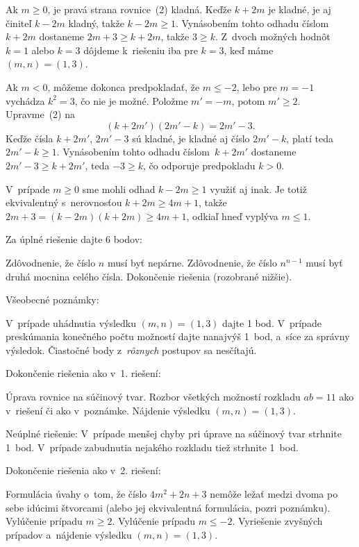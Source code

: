 {Ak $m \ge 0$, je pravá strana rovnice~(2) kladná. Keďže $k+2m$ je
kladné, je aj činiteľ $k-2m$ kladný, takže $k-2m \ge 1$.
Vynásobením tohto odhadu číslom~$k+2m$ dostaneme $2m+3\ge k+2m$,
takže $3 \ge k$. Z~dvoch možných hodnôt $k=1$ alebo $k=3$
dôjdeme k~riešeniu iba pre $k=3$, keď máme $(m, n) = (1,3)$.

Ak $m <0$, môžeme dokonca predpokladať, že $m\le{-2}$, lebo pre $m={-1}$
vychádza $k^2=3$, čo nie je možné. Položme $m'={-m}$, potom $m'\ge 2$. Upravme~(2) na
$$
(k+2m')(2m'-k) = 2m'-3.
$$
Keďže čísla
$k+2m'$, $2m'-3$ sú kladné, je kladné aj číslo $2m'-k$, platí teda $2m'-k\ge1$.
Vynásobením tohto odhadu číslom~$k+2m'$ dostaneme $2m'-3 \ge k+2m'$, teda
$-3\ge k$, čo odporuje predpokladu $k>0$.

\poznamka
V~prípade $m \ge 0$ sme mohli odhad $k-2m \ge 1$ využiť
aj inak. Je totiž ekvivalentný s~nerovnosťou $k+2m\ge 4m+1$, takže
$2m+3 = (k-2m)(k+2m)\ge {4m+1}$, odkiaľ hneď vyplýva $m \leq 1$.


\nobreak\medskip\petit
\BeginSchema

\Podnadpis Za úplné riešenie dajte 6 bodov:

 Zdôvodnenie, že číslo $n$ musí byť nepárne.
 Zdôvodnenie, že číslo $n^{n-1}$ musí byť druhá mocnina celého čísla.
 Dokončenie riešenia (rozobrané nižšie).

\Podnadpis Všeobecné poznámky:

\Item V~prípade uhádnutia výsledku $(m, n) = (1,3)$ dajte 1 bod.
\Item V~prípade preskúmania konečného počtu možností dajte nanajvýš 1~bod, a~síce za správny výsledok.
\Item Čiastočné body z~{\it rôznych\/} postupov sa nesčítajú.

\Podnadpis Dokončenie riešenia ako v~1. riešení:

 Úprava rovnice na súčinový tvar.
 Rozbor všetkých možností rozkladu $ab=11$ ako v~riešení či ako v~poznámke.
 Nájdenie výsledku $(m, n) = (1, 3)$.

Neúplné riešenie: V~prípade menšej chyby pri úprave na
súčinový tvar strhnite 1~bod. V~prípade zabudnutia nejakého rozkladu
tiež strhnite 1~bod.

\Podnadpis Dokončenie riešenia ako v~2. riešení:

 Formulácia úvahy o~tom, že číslo $4m^2+2n+3$ nemôže
ležať medzi dvoma po sebe idúcimi štvorcami (alebo jej ekvivalentná
formulácia, pozri poznámku).
 Vylúčenie prípadu $m\ge2$.
 Vylúčenie prípadu $m \le-2$.
 Vyriešenie zvyšných prípadov a~nájdenie výsledku $(m, n) = (1,3)$.

}
